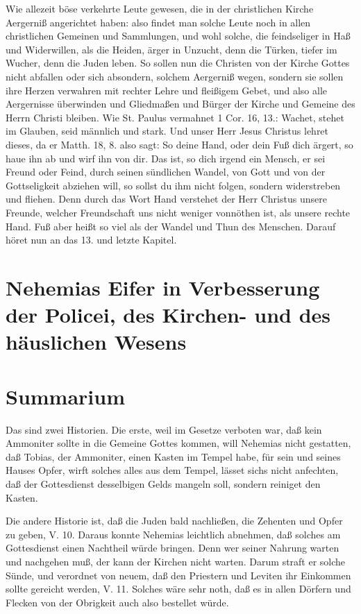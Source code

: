 Wie allezeit böse verkehrte Leute gewesen, die in der christlichen Kirche Aergerniß angerichtet haben: also findet man solche Leute noch in allen christlichen Gemeinen und Sammlungen, und wohl solche, die feindseliger in Haß und Widerwillen, als die Heiden, ärger in Unzucht, denn die Türken, tiefer im Wucher, denn die Juden leben. So sollen nun die Christen von der Kirche Gottes nicht abfallen oder sich absondern, solchem Aergerniß wegen, sondern sie sollen ihre Herzen verwahren mit rechter Lehre und fleißigem Gebet, und also alle Aergernisse überwinden und Gliedmaßen und Bürger der Kirche und Gemeine des Herrn Christi bleiben. Wie St. Paulus vermahnet 1 Cor. 16, 13.: Wachet, stehet im Glauben, seid männlich und stark. Und unser Herr Jesus Christus lehret dieses, da er Matth. 18, 8. also sagt: So deine Hand, oder dein Fuß dich ärgert, so haue ihn ab und wirf ihn von dir. Das ist, so dich irgend ein Mensch, er sei Freund oder Feind, durch seinen sündlichen Wandel, von Gott und von der Gottseligkeit abziehen will, so sollst du ihm nicht folgen, sondern widerstreben und fliehen. Denn durch das Wort Hand verstehet der Herr Christus unsere Freunde, welcher Freundschaft uns nicht weniger vonnöthen ist, als unsere rechte Hand. Fuß aber heißt so viel als der Wandel und Thun des Menschen. Darauf höret nun an das 13. und letzte Kapitel.

\section[Nehemias Eifer in Verbesserung der Policei, des Kirchen-]{Nehemias Eifer in Verbesserung der Policei, des Kirchen- und des häuslichen Wesens}


\section{Summarium}

Das sind zwei Historien. Die erste, weil im Gesetze verboten war, daß kein Ammoniter sollte in die Gemeine Gottes kommen, will Nehemias nicht gestatten, daß Tobias, der Ammoniter, einen Kasten im Tempel habe, für sein und seines Hauses Opfer, wirft solches alles aus dem Tempel, lässet sichs nicht anfechten, daß der Gottesdienst desselbigen Gelds mangeln soll, sondern reiniget den Kasten.

Die andere Historie ist, daß die Juden bald nachließen, die Zehenten und Opfer zu geben, V. 10. Daraus konnte Nehemias leichtlich abnehmen, daß solches am Gottesdienst einen Nachtheil würde bringen. Denn wer seiner Nahrung warten und nachgehen muß, der kann der Kirchen nicht warten. Darum straft er solche Sünde, und verordnet von neuem, daß den Priestern und Leviten ihr Einkommen sollte gereicht werden, V. 11. Solches wäre sehr noth, daß es in allen Dörfern und Flecken von der Obrigkeit auch also bestellet würde.

